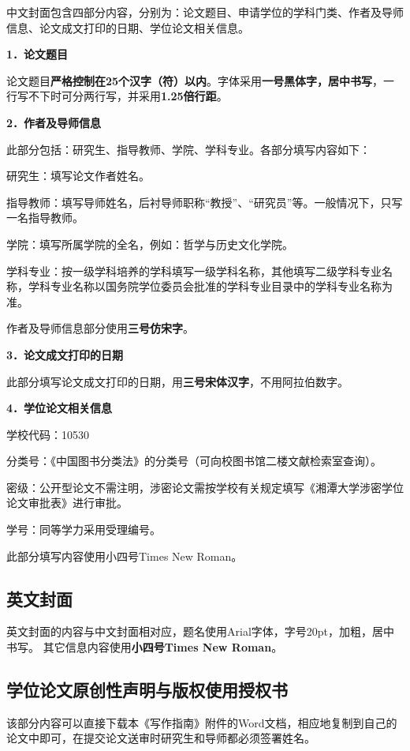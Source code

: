 中文封面包含四部分内容，分别为：论文题目、申请学位的学科门类、作者及导师信息、论文成文打印的日期、学位论文相关信息。

\textbf{1．论文题目}

论文题目\textbf{严格控制在25个汉字（符）以内}。字体采用\textbf{一号黑体字，居中书写}，一行写不下时可分两行写，并采用\textbf{1.25倍行距}。

\textbf{2．作者及导师信息}

此部分包括：研究生、指导教师、学院、学科专业。各部分填写内容如下：

研究生：填写论文作者姓名。

指导教师：填写导师姓名，后衬导师职称“教授”、“研究员”等。一般情况下，只写一名指导教师。

学院：填写所属学院的全名，例如：哲学与历史文化学院。

学科专业：按一级学科培养的学科填写一级学科名称，其他填写二级学科专业名称，学科专业名称以国务院学位委员会批准的学科专业目录中的学科专业名称为准。

作者及导师信息部分使用\textbf{三号仿宋字}。

\textbf{3．论文成文打印的日期}

此部分填写论文成文打印的日期，用\textbf{三号宋体汉字}，不用阿拉伯数字。

\textbf{4．学位论文相关信息}

学校代码：10530

分类号：《中国图书分类法》的分类号（可向校图书馆二楼文献检索室查询）。

密级：公开型论文不需注明，涉密论文需按学校有关规定填写《湘潭大学涉密学位论文审批表》进行审批。

学号：同等学力采用受理编号。

此部分填写内容使用小四号Times New Roman。

\subsection{英文封面}

英文封面的内容与中文封面相对应，题名使用Arial字体，字号20pt，加粗，居中书写。 其它信息内容使用\textbf{小四号Times New Roman}。

\subsection{学位论文原创性声明与版权使用授权书}

该部分内容可以直接下载本《写作指南》附件的Word文档，相应地复制到自己的论文中即可，在提交论文送审时研究生和导师都必须签署姓名。

